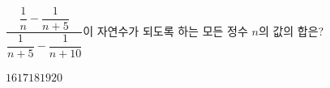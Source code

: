 \hspace*{2mm}\begin{minipage}[t]{\dimexpr\linewidth-2mm\relax}\vspace{0pt}
$\dfrac{\dfrac{1}{n}-\dfrac{1}{n+5}}{\dfrac{1}{n+5}-\dfrac{1}{n+10}}$이 자연수가 되도록 하는 모든 정수 $n$의 값의 합은?
\begin{choices32}{$16$}{$17$}{$18$}{$19$}{$20$}\end{choices32}\end{minipage}

